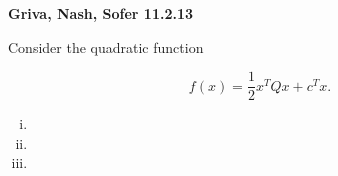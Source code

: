 \textbf{Griva, Nash, Sofer 11.2.13}

Consider the quadratic function

$$
f(x) = \frac{1}{2} x^T Q x + c^T x.
$$

\begin{enumerate}[(i)]
  \item 
  \pagebreak
  \item 
  \pagebreak
  \item 
\end{enumerate}

